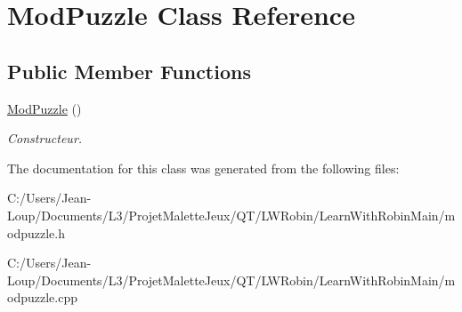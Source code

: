\hypertarget{class_mod_puzzle}{}\section{Mod\+Puzzle Class Reference}
\label{class_mod_puzzle}
\subsection*{Public Member Functions}
\begin{DoxyCompactItemize}
\item 
\mbox{\label{class_mod_puzzle_a04ee0a6dcc0a21a252c36c9fb009fe1c}} 
\hyperlink{class_mod_puzzle_a04ee0a6dcc0a21a252c36c9fb009fe1c}{Mod\+Puzzle} ()
\begin{DoxyCompactList}\small\item\em Constructeur. \end{DoxyCompactList}\end{DoxyCompactItemize}


The documentation for this class was generated from the following files\+:\begin{DoxyCompactItemize}
\item 
C\+:/\+Users/\+Jean-\/\+Loup/\+Documents/\+L3/\+Projet\+Malette\+Jeux/\+Q\+T/\+L\+W\+Robin/\+Learn\+With\+Robin\+Main/modpuzzle.\+h\item 
C\+:/\+Users/\+Jean-\/\+Loup/\+Documents/\+L3/\+Projet\+Malette\+Jeux/\+Q\+T/\+L\+W\+Robin/\+Learn\+With\+Robin\+Main/modpuzzle.\+cpp\end{DoxyCompactItemize}
